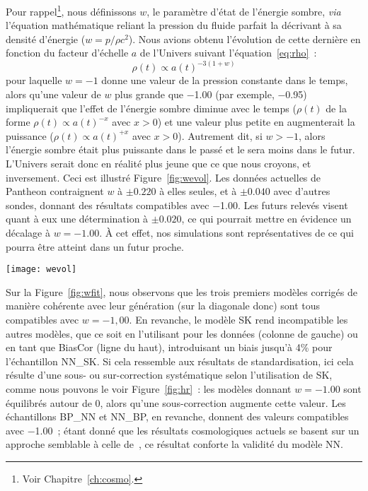 \documentclass[../main/main.tex]{subfiles}
\begin{document}
Pour rappel\footnote{Voir Chapitre~\ref{ch:cosmo}.}, nous définissons $w$, le
paramètre d'état de l'énergie sombre, \textit{via} l'équation mathématique
reliant la pression du fluide parfait la décrivant à sa densité d'énergie ($w =
p/\rho c^2$). Nous avions obtenu l'évolution de cette dernière en fonction du
facteur d'échelle $a$ de l'Univers suivant l'équation~\ref{eq:rho}~:
\begin{equation}
    \rho(t) \propto a(t)^{-3(1+w)}
\end{equation}
pour laquelle $w = -1$ donne une valeur de la pression constante dans le temps,
alors qu'une valeur de $w$ plus grande que \num{-1.00} (par exemple,
\num{-0.95}) impliquerait que l'effet de l'énergie sombre diminue avec le temps
($\rho(t)$ de la forme $\rho(t) \propto a(t)^{-x}$ avec $x > 0$) et une valeur
plus petite en augmenterait la puissance ($\rho(t) \propto a(t)^{+x}$ avec $x >
0$). Autrement dit, si $w > -1$, alors l'énergie sombre était plus puissante
dans le passé et le sera moins dans le futur. L'Univers serait donc en réalité
plus jeune que ce que nous croyons, et inversement. Ceci est illustré
Figure~\ref{fig:wevol}. Les données actuelles de Pantheon \citep{scolnic2018}
contraignent $w$ à $\pm \num{0.220}$ à elles seules, et à $\pm \num{0.040}$ avec
d'autres sondes, donnant des résultats compatibles avec \num{-1.00}. Les futurs
relevés visent quant à eux une détermination à $\pm \num{0.020}$, ce qui
pourrait mettre en évidence un décalage à $w = \num{-1.00}$. À cet effet, nos
simulations sont représentatives de ce qui pourra être atteint dans un futur
proche.

\begin{SCfigure}[1]
    \centering
    \texttt{[image: wevol]}
    \caption[Effet d'une variation de $w$ sur le facteur d'échelle de
    l'Univers]{Effet d'une variation de $w$ sur le facteur d'échelle de
    l'Univers. Une valeur $< -1$ (par exemple, \num{-1.1}) ferait que l'Univers
est plus âgé que ce que nous croyons, et inversement.}
    \label{fig:wevol}
\end{SCfigure}

Sur la Figure~\ref{fig:wfit}, nous observons que les trois premiers modèles
corrigés de manière cohérente avec leur génération (sur la diagonale donc) sont
tous compatibles avec $w = -1,00$. En revanche, le modèle SK rend incompatible
les autres modèles, que ce soit en l'utilisant pour les données (colonne de
gauche) ou en tant que BiasCor (ligne du haut), introduisant un biais jusqu'à
4\% pour l'échantillon NN\_SK. Si cela ressemble aux résultats de
standardisation, ici cela résulte d'une sous- ou sur-correction systématique
selon l'utilisation de SK, comme nous pouvons le voir Figure~\ref{fig:hr}~: les
modèles donnant $w = \num{-1.00}$ sont équilibrés autour de 0, alors qu'une
sous-correction augmente cette valeur. Les échantillons BP\_NN et NN\_BP, en
revanche, donnent des valeurs compatibles avec \num{-1.00}~; étant donné que les
résultats cosmologiques actuels se basent sur un approche semblable à celle
de~, ce résultat conforte la validité du modèle NN.
\end{document}
